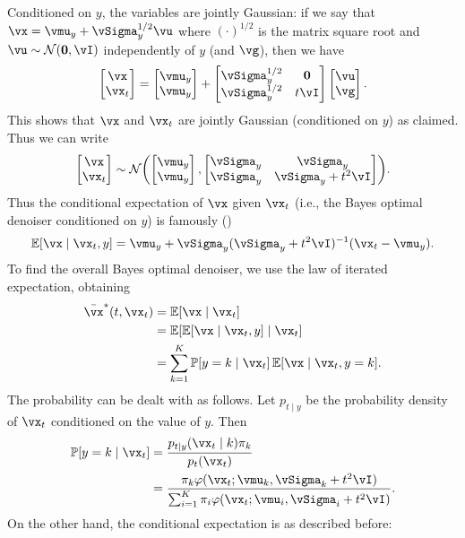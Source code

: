 \documentclass[../../book-main.tex]{subfiles}
\begin{document}
\begin{example}
	Conditioned on \(y\), the variables are jointly Gaussian: if we say that \(\vx = \vmu_{y} + \vSigma_{y}^{1/2}\vu\) where \((\cdot)^{1/2}\) is the matrix square root and \(\vu \sim \dNorm(\vzero, \vI)\) independently of \(y\) (and \(\vg\)), then we have
	\begin{equation}
		\mat{\vx \\ \vx_{t}} = \mat{\vmu_{y} \\ \vmu_{y}} + \mat{\vSigma_{y}^{1/2} & \vzero \\ \vSigma_{y}^{1/2} & t\vI}\mat{\vu \\ \vg}.
	\end{equation}
	This shows that \(\vx\) and \(\vx_{t}\) are jointly Gaussian (conditioned on \(y\)) as claimed. Thus we can write
	\begin{equation}
		\mat{\vx \\ \vx_{t}} \sim \dNorm\rp{\mat{\vmu_{y} \\ \vmu_{y}}, \mat{\vSigma_{y} & \vSigma_{y} \\ \vSigma_{y} & \vSigma_{y} + t^{2}\vI}}.
	\end{equation}
	Thus the conditional expectation of \(\vx\) given \(\vx_{t}\) (i.e., the
	Bayes optimal denoiser conditioned on \(y\)) is famously
	()
	\begin{equation}
		\Ex[\vx \mid \vx_{t}, y] = \vmu_{y} + \vSigma_{y}(\vSigma_{y} + t^{2}\vI)^{-1}(\vx_{t} - \vmu_{y}).
	\end{equation}
	To find the overall Bayes optimal denoiser, we use the law of iterated expectation, obtaining
	\begin{align}
		\bar{\vx}^{\ast}(t, \vx_{t})
		&= \Ex[\vx \mid \vx_{t}] \\ 
		&= \Ex[\Ex[\vx \mid \vx_{t}, y] \mid \vx_{t}] \\ 
		&= \sum_{k = 1}^{K}\Pr[y = k \mid \vx_{t}]\Ex[\vx \mid \vx_{t}, y = k].
	\end{align}
	The probability can be dealt with as follows. Let \(p_{t \mid y}\) be the probability density of \(\vx_{t}\) conditioned on the value of \(y\). Then
	\begin{align}
		\Pr[y = k \mid \vx_{t}]
		&= \frac{p_{t \mid y}(\vx_{t} \mid k)\pi_{k}}{p_{t}(\vx_{t})} \\ 
		&= \frac{\pi_{k}\phi(\vx_{t} ; \vmu_{k}, \vSigma_{k}
		+ t^{2}\vI)}{\sum_{i = 1}^{K}\pi_{i}\phi(\vx_{t} ; \vmu_{i}, \vSigma_{i} + t^{2}\vI)}.
	\end{align}
	On the other hand, the conditional expectation is as described before:

\end{example}
\end{document}

